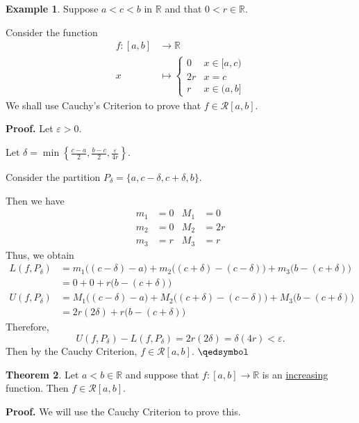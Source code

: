 \documentclass[11pt]{article}
\theoremstyle{definition}
\newtheorem{thm}{Theorem}[section]
\newtheorem{exmp}[thm]{Example}
\newcommand{\mbR}{\ensuremath{\mathbb{R}}}
\begin{document}
\begin{exmp} 
Suppose $a < c < b$ in $\mbR$ and that $0 < r \in \mbR$. 

Consider the function
\begin{align*}
f : [a, b] & \to \mbR \\
          x & \mapsto \begin{cases}
          				0 & x \in [a, c) \\
          				2r & x = c \\
          				r & x \in (a, b]
				   \end{cases}
\end{align*}
We shall use Cauchy's Criterion to prove that $f \in \mathcal{R}[a, b]$. 

\textbf{Proof.} Let $\varepsilon > 0$. 

Let $\delta = \min\left\{\frac{c-a}2, \frac{b-c}2, \frac{\varepsilon}{4r}\right\}$. 

Consider the partition $P_{\delta} = \{a, c - \delta, c + \delta, b\}$. 

Then we have
\begin{align*}
m_1 & = 0 & M_1 & = 0 \\
m_2 & = 0 & M_2 & = 2r \\
m_3 & = r & M_3 & = r
\end{align*}
Thus, we obtain
\begin{align*}
L(f, P_{\delta}) & = m_1 \Big((c-\delta) - a\Big) + m_2 \Big((c+\delta) - (c - \delta)\Big) + m_3 \Big(b - (c + \delta)\Big) \\
			    & = 0 + 0 + r\Big(b - (c + \delta)\Big) \\
U(f, P_{\delta}) & = M_1 \Big((c-\delta) - a\Big) + M_2 \Big((c+\delta) - (c - \delta)\Big) + M_3 \Big(b - (c + \delta)\Big) \\
			    & = 2r(2\delta) + r\Big(b - (c+\delta)\Big)
\end{align*}
Therefore,
$$U(f, P_{\delta}) - L(f, P_{\delta}) = 2r(2\delta) = \delta(4r) < \varepsilon \text{.}$$
Then by the Cauchy Criterion, $f \in \mathcal{R}[a, b]$. $\qedsymbol$
\end{exmp}

\begin{thm}
Let $a < b \in \mbR$ and suppose that $f : [a, b] \to \mbR$ is an \underline{increasing} function. Then $f \in \mathcal{R}[a, b]$.
\end{thm}
\textbf{Proof.} 
We will use the Cauchy Criterion to prove this. 
\end{document}
